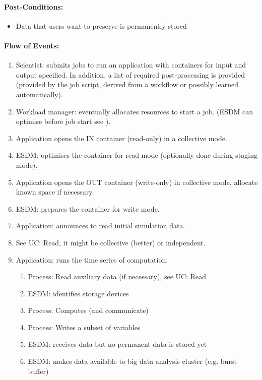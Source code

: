 \paragraph{Post-Conditions:}
\begin{itemize}
	\item Data that users want to preserve is permanently stored
\end{itemize}




\paragraph{Flow of Events:}
\begin{enumerate}
	\item Scientist: submits jobs to run an application with containers for input and output specified. In addition, a list of required post-processing is provided (provided by the job script, derived from a workflow or possibly learned automatically).
	\item Workload manager: eventually allocates resources to start a job. (ESDM can optimise before job start see ).
	\item Application opens the IN container (read-only) in a collective mode.
	\item ESDM: optimises the container for read mode (optionally done during staging mode).
	\item Application opens the OUT container (write-only) in collective mode, allocate known space if necessary.
	\item ESDM: prepares the container for write mode.
	\item Application: announces to read initial simulation data.
	\item See UC: Read, it might be collective (better) or independent.
	\item Application: runs the time series of computation:
	\begin{enumerate}
		\item Process: Read auxiliary data (if necessary), see UC: Read
		\item ESDM: identifies storage devices
		\item Process: Computes (and communicate)
		\item Process: Writes a subset of variables
		\item ESDM: receives data but no permanent data is stored yet
		\item ESDM: makes data available to big data analysis cluster (e.g. burst buffer)

\end{enumerate}
\end{enumerate}
